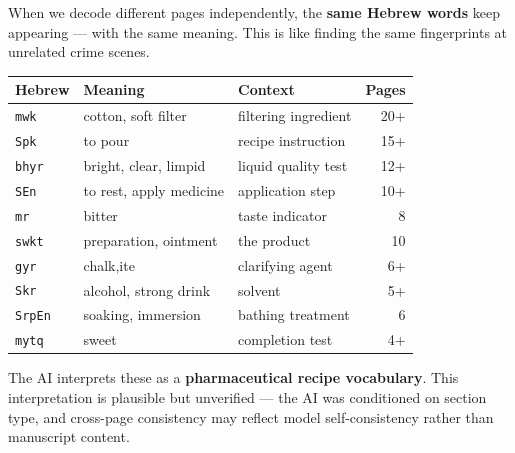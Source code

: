 \documentclass[11pt,a4paper]{article}
\begin{document}
\begin{tcolorbox}[title={\large Figure 3: The same words appear on different pages}]
When we decode different pages independently, the \textbf{same Hebrew words}
keep appearing --- with the same meaning. This is like finding the same
fingerprints at unrelated crime scenes.

\medskip
\begin{center}
\renewcommand{\arraystretch}{1.3}
\begin{tabular}{lllr}
\toprule
\textbf{Hebrew} & \textbf{Meaning} & \textbf{Context} & \textbf{Pages} \\
\midrule
\texttt{mwk} & cotton, soft filter & filtering ingredient & 20+ \\
\texttt{Spk} & to pour & recipe instruction & 15+ \\
\texttt{bhyr} & bright, clear, limpid & liquid quality test & 12+ \\
\texttt{SEn} & to rest, apply medicine & application step & 10+ \\
\texttt{mr} & bitter & taste indicator & 8 \\
\texttt{swkt} & preparation, ointment & the product & 10 \\
\texttt{gyr} & chalk,ite & clarifying agent & 6+ \\
\texttt{Skr} & alcohol, strong drink & solvent & 5+ \\
\texttt{SrpEn} & soaking, immersion & bathing treatment & 6 \\
\texttt{mytq} & sweet & completion test & 4+ \\
\bottomrule
\end{tabular}
\end{center}

\medskip
\noindent
The AI interprets these as a \textbf{pharmaceutical recipe vocabulary}.
This interpretation is plausible but unverified --- the AI was conditioned
on section type, and cross-page consistency may reflect model self-consistency
rather than manuscript content.
\end{tcolorbox}

\newpage
\end{document}
